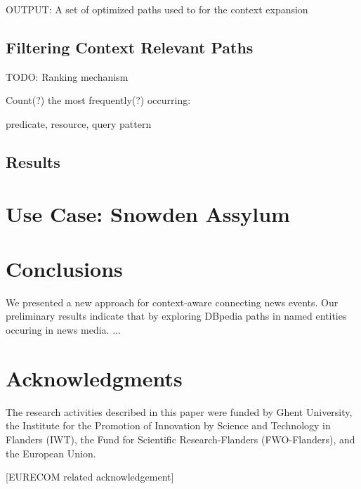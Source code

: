 \documentclass{acm_proc_article-sp}
\begin{document}
OUTPUT: A set of optimized paths used to for the context expansion

\subsection{Filtering Context Relevant Paths}

TODO: Ranking mechanism

Count(?) the most frequently(?) occurring:

predicate,
resource,
query pattern





\subsection{Results}



\section{Use Case: Snowden Assylum}


\section{Conclusions}
We presented a new approach for context-aware connecting news events. Our preliminary results indicate that by exploring DBpedia paths in named entities occuring in news media. ...

\section{Acknowledgments}
The research activities described in this paper were funded by Ghent University,
the Institute for the Promotion of Innovation by Science and Technology in Flanders (IWT), the Fund for Scientific Research-Flanders (FWO-Flanders), and the European Union.

[EURECOM related acknowledgement]

%

%
%
\end{document}

